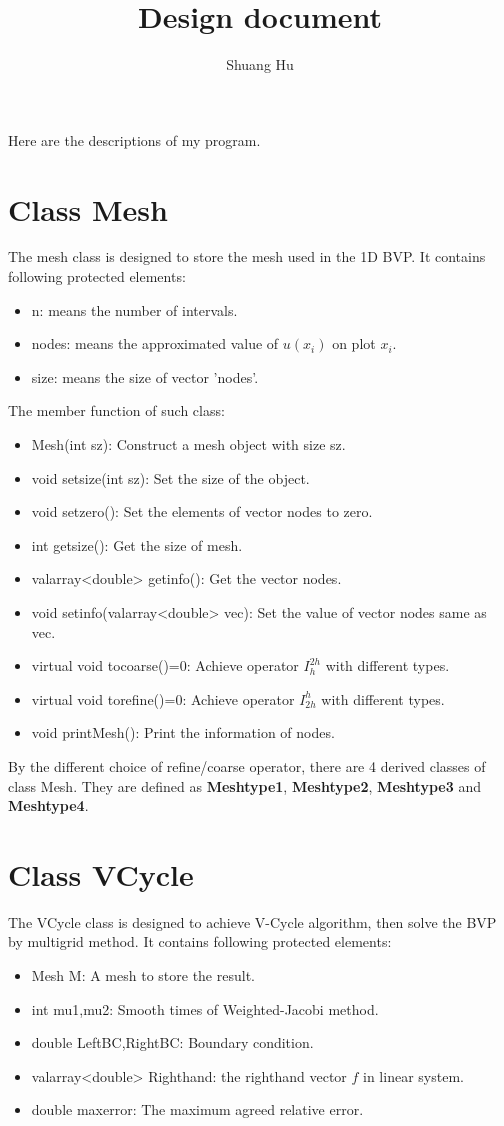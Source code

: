 \documentclass[UTF8]{ctexart}
\title{Design document}
\author{Shuang Hu}
\theoremstyle{plain}
\theoremstyle{definition}
\theoremstyle{remark}
\begin{document}
\maketitle
Here are the descriptions of my program.
\section*{Class Mesh}
The mesh class is designed to store the mesh used in the 1D BVP. It contains following protected elements:
\begin{itemize}
\item n: means the number of intervals.
\item nodes: means the approximated value of $u(x_{i})$ on plot $x_{i}$.
\item size: means the size of vector 'nodes'.
\end{itemize}

The member function of such class:
\begin{itemize}
\item Mesh(int sz): Construct a mesh object with size sz.
\item void setsize(int sz): Set the size of the object.
\item void setzero(): Set the elements of vector nodes to zero.
\item int getsize(): Get the size of mesh.
\item valarray<double> getinfo(): Get the vector nodes.
\item void setinfo(valarray<double> vec): Set the value of vector nodes same as vec.
\item virtual void tocoarse()=0: Achieve operator $I_{h}^{2h}$ with different types.
\item virtual void torefine()=0: Achieve operator $I_{2h}^{h}$ with different types.
\item void printMesh(): Print the information of nodes.
\end{itemize}

By the different choice of refine/coarse operator, there are 4 derived classes of class Mesh. They are defined as \textbf{Meshtype1}, \textbf{Meshtype2}, \textbf{Meshtype3} and \textbf{Meshtype4}.
\section*{Class VCycle}
The VCycle class is designed to achieve V-Cycle algorithm, then solve the BVP by multigrid method. It contains following protected elements:
\begin{itemize}
\item Mesh M: A mesh to store the result.
\item int mu1,mu2: Smooth times of Weighted-Jacobi method.
\item double LeftBC,RightBC: Boundary condition.
\item valarray<double> Righthand: the righthand vector $f$ in linear system.
\item double maxerror: The maximum agreed relative error.
\end{itemize}
\end{document}
